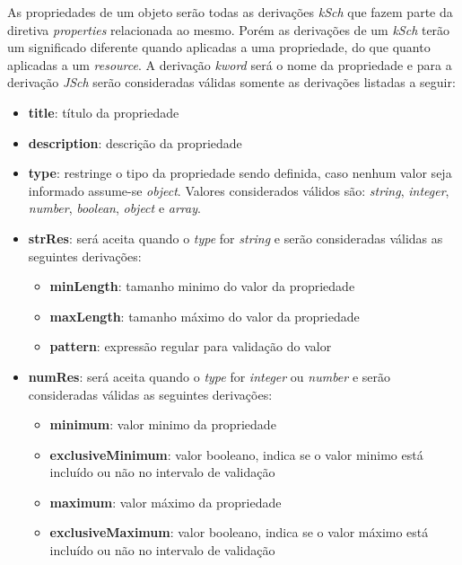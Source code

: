 \label{sec:bnf:props}
As propriedades de um objeto serão todas as derivações \textit{kSch} que fazem parte da diretiva \textit{properties} relacionada ao mesmo. Porém as derivações de um \textit{kSch} terão um significado diferente quando aplicadas a uma propriedade, do que quanto aplicadas a um \textit{resource}. A derivação \textit{kword} será o nome da propriedade e para a derivação \textit{JSch} serão consideradas válidas somente as derivações listadas a seguir:
\begin{itemize}
    \item \textbf{title}: título da propriedade
    
    \item \textbf{description}: descrição da propriedade
    
    \item \textbf{type}: restringe o tipo da propriedade sendo definida, caso nenhum valor seja informado assume-se \textit{object}. Valores considerados válidos são: \textit{string}, \textit{integer}, \textit{number}, \textit{boolean}, \textit{object} e \textit{array}.
    
    \item \textbf{strRes}: será aceita quando o \textit{type} for \textit{string} e serão consideradas válidas as seguintes derivações:
    \begin{itemize}
        \item \textbf{minLength}: tamanho minimo do valor da propriedade
        \item \textbf{maxLength}: tamanho máximo do valor da propriedade
        \item \textbf{pattern}: expressão regular para validação do valor
    \end{itemize}
    
    \item \textbf{numRes}: será aceita quando o \textit{type} for \textit{integer} ou \textit{number} e serão consideradas válidas as seguintes derivações:
    \begin{itemize}
        \item \textbf{minimum}: valor minimo da propriedade
        \item \textbf{exclusiveMinimum}: valor booleano, indica se o valor minimo está incluído ou não no intervalo de validação
        \item \textbf{maximum}: valor máximo da propriedade
        \item \textbf{exclusiveMaximum}: valor booleano, indica se o valor máximo está incluído ou não no intervalo de validação
    \end{itemize}
    

\end{itemize}
